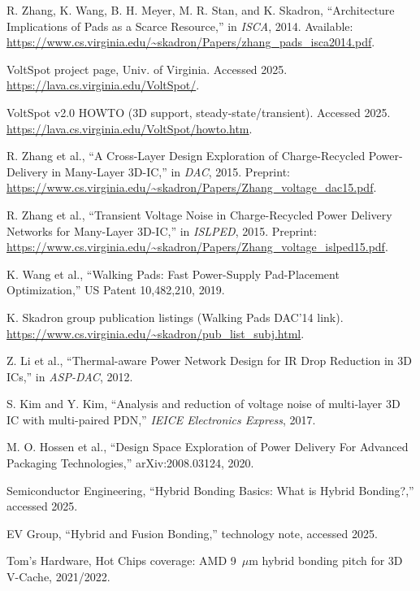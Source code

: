 \documentclass[conference]{IEEEtran}
\begin{document}

\begin{thebibliography}{99}

R. Zhang, K. Wang, B. H. Meyer, M. R. Stan, and K. Skadron, ``Architecture Implications of Pads as a Scarce Resource,'' in \emph{ISCA}, 2014. Available: \url{https://www.cs.virginia.edu/~skadron/Papers/zhang_pads_isca2014.pdf}.

VoltSpot project page, Univ. of Virginia. Accessed 2025. \url{https://lava.cs.virginia.edu/VoltSpot/}.

VoltSpot v2.0 HOWTO (3D support, steady-state/transient). Accessed 2025. \url{https://lava.cs.virginia.edu/VoltSpot/howto.htm}.

R. Zhang et al., ``A Cross-Layer Design Exploration of Charge-Recycled Power-Delivery in Many-Layer 3D-IC,'' in \emph{DAC}, 2015. Preprint: \url{https://www.cs.virginia.edu/~skadron/Papers/Zhang_voltage_dac15.pdf}.

R. Zhang et al., ``Transient Voltage Noise in Charge-Recycled Power Delivery Networks for Many-Layer 3D-IC,'' in \emph{ISLPED}, 2015. Preprint: \url{https://www.cs.virginia.edu/~skadron/Papers/Zhang_voltage_islped15.pdf}.

K. Wang et al., ``Walking Pads: Fast Power-Supply Pad-Placement Optimization,'' US Patent 10,482,210, 2019. 

K. Skadron group publication listings (Walking Pads DAC’14 link). \url{https://www.cs.virginia.edu/~skadron/pub_list_subj.html}.

Z. Li et al., ``Thermal-aware Power Network Design for IR Drop Reduction in 3D ICs,'' in \emph{ASP-DAC}, 2012.

S. Kim and Y. Kim, ``Analysis and reduction of voltage noise of multi-layer 3D IC with multi-paired PDN,'' \emph{IEICE Electronics Express}, 2017.

M. O. Hossen et al., ``Design Space Exploration of Power Delivery For Advanced Packaging Technologies,'' arXiv:2008.03124, 2020.

Semiconductor Engineering, ``Hybrid Bonding Basics: What is Hybrid Bonding?,'' accessed 2025.

EV Group, ``Hybrid and Fusion Bonding,'' technology note, accessed 2025.

Tom’s Hardware, Hot Chips coverage: AMD 9~$\mu$m hybrid bonding pitch for 3D V-Cache, 2021/2022.


\end{thebibliography}
\end{document}
